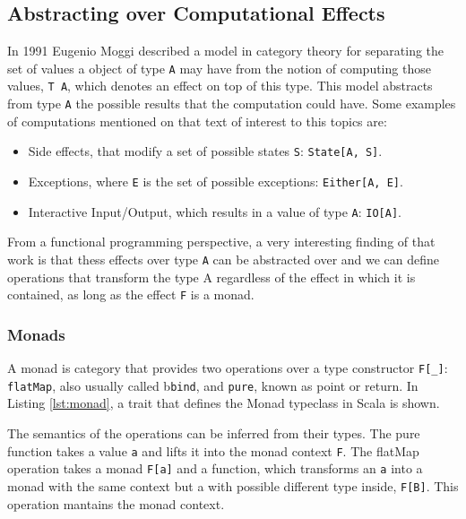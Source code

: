 \documentclass[../main.tex]{subfiles}
\begin{document}
\subsection{Abstracting over Computational Effects}
In 1991 Eugenio Moggi \autocite{MoggiNotionsMonads} described a model
in category theory for separating the set of values a object of type \texttt{A} may have from
the notion of computing those values, \texttt{T A}, which denotes an effect on top of
this type. This model abstracts from type \texttt{A} the possible
results that the computation could have. Some examples of computations mentioned
on that text of interest to this topics are:

\begin{itemize}
\item Side effects, that modify a set of possible states \texttt{S}: \texttt{State[A, S]}.
\item Exceptions, where \texttt{E} is the set of possible exceptions: \texttt{Either[A, E]}.
\item Interactive Input/Output, which results in a value of type \texttt{A}: \texttt{IO[A]}.
\end{itemize}

From a functional programming perspective, a very interesting finding of that
work is that thess effects over type \texttt{A} can be abstracted over and we can define
operations that transform the type A regardless of the effect in which it is
contained, as long as the effect \texttt{F} is a monad. %

\subsubsection{Monads}
A monad is category that provides two operations over a type constructor
\texttt{F[\_]}: \texttt{flatMap}, also usually called b\texttt{bind}, and \texttt{pure},
known as point or return. In Listing \ref{lst:monad}, a trait that defines the
Monad typeclass in Scala is shown.



The semantics of the operations can be inferred from their types.
The pure function takes a value \texttt{a} and lifts it into the monad context
\texttt{F}. The flatMap operation takes a monad \texttt{F[a]} and a function,
which transforms an \texttt{a} into a monad with the same context but a with possible
different type inside, \texttt{F[B]}. This operation mantains the monad context.
\end{document}

